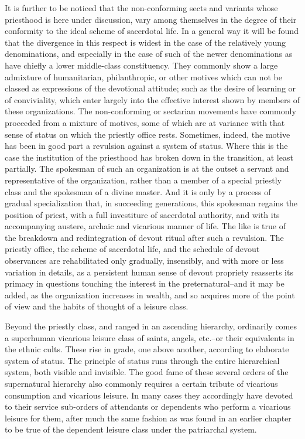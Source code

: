 \documentclass[12pt]{report}
\begin{document}
It is further to be noticed that the non-conforming sects and variants
whose priesthood is here under discussion, vary among themselves in the
degree of their conformity to the ideal scheme of sacerdotal life. In
a general way it will be found that the divergence in this respect is
widest in the case of the relatively young denominations, and especially
in the case of such of the newer denominations as have chiefly a lower
middle-class constituency. They commonly show a large admixture of
humanitarian, philanthropic, or other motives which can not be classed
as expressions of the devotional attitude; such as the desire of
learning or of conviviality, which enter largely into the effective
interest shown by members of these organizations. The non-conforming or
sectarian movements have commonly proceeded from a mixture of motives,
some of which are at variance with that sense of status on which the
priestly office rests. Sometimes, indeed, the motive has been in good
part a revulsion against a system of status. Where this is the case
the institution of the priesthood has broken down in the transition, at
least partially. The spokesman of such an organization is at the outset
a servant and representative of the organization, rather than a member
of a special priestly class and the spokesman of a divine master. And
it is only by a process of gradual specialization that, in succeeding
generations, this spokesman regains the position of priest, with a full
investiture of sacerdotal authority, and with its accompanying austere,
archaic and vicarious manner of life. The like is true of the breakdown
and redintegration of devout ritual after such a revulsion. The priestly
office, the scheme of sacerdotal life, and the schedule of devout
observances are rehabilitated only gradually, insensibly, and with more
or less variation in details, as a persistent human sense of devout
propriety reasserts its primacy in questions touching the interest in
the preternatural--and it may be added, as the organization increases
in wealth, and so acquires more of the point of view and the habits of
thought of a leisure class.

Beyond the priestly class, and ranged in an ascending hierarchy,
ordinarily comes a superhuman vicarious leisure class of saints, angels,
etc.--or their equivalents in the ethnic cults. These rise in grade, one
above another, according to elaborate system of status. The principle of
status runs through the entire hierarchical system, both visible and
invisible. The good fame of these several orders of the supernatural
hierarchy also commonly requires a certain tribute of vicarious
consumption and vicarious leisure. In many cases they accordingly have
devoted to their service sub-orders of attendants or dependents who
perform a vicarious leisure for them, after much the same fashion as was
found in an earlier chapter to be true of the dependent leisure class
under the patriarchal system.
\end{document}
